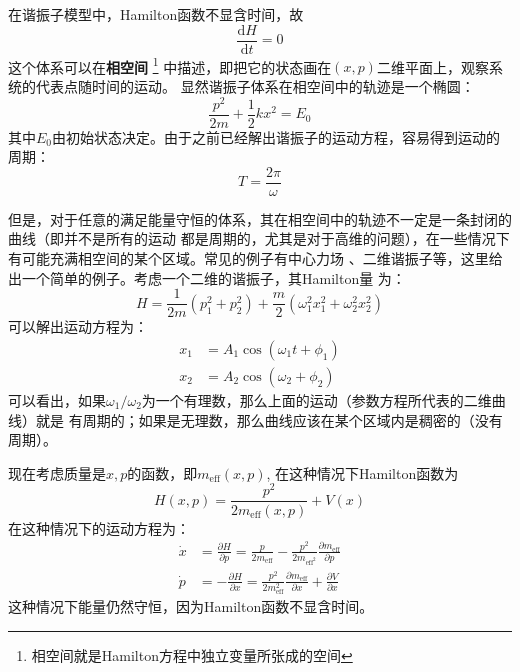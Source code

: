    \par 
    在谐振子模型中，Hamilton函数不显含时间，故
    \begin{equation}
        \frac {\mathrm{d}H}{\mathrm{d}t} = 0
    \end{equation}
    这个体系可以在\textbf{相空间}
    \footnote{相空间就是Hamilton方程中独立变量所张成的空间}
    中描述，即把它的状态画在$(x,p)$二维平面上，观察系统的代表点随时间的运动。
    显然谐振子体系在相空间中的轨迹是一个椭圆：
    \begin{equation}
        \frac{p^2}{2m} + \frac 12 kx^2 = E_0
    \end{equation}
    其中$E_0$由初始状态决定。由于之前已经解出谐振子的运动方程，容易得到运动的周期：
    \begin{equation}
        T = \frac{2\pi}{\omega}
    \end{equation}
    \par 
    但是，对于任意的满足能量守恒的体系，其在相空间中的轨迹不一定是一条封闭的曲线（即并不是所有的运动
    都是周期的，尤其是对于高维的问题），在一些情况下有可能充满相空间的某个区域。常见的例子有中心力场
    \cite{Landau2007mechanics}、二维谐振子等\cite{B2006经典力学的数学方法}，这里给出一个简单的例子。考虑一个二维的谐振子，其Hamilton量
    为：
    \begin{equation}
        H = \frac{1}{2m}(p_1^2 + p_2^2) + \frac{m}{2}(\omega_1^2x_1^2 + \omega_2^2x_2^2)
    \end{equation}
    可以解出运动方程为：
    \begin{equation}
        \begin{split}
            x_1 &= A_1\cos(\omega_1 t + \phi_1)\\
            x_2 &= A_2\cos(\omega_2 + \phi_2)
        \end{split}
    \end{equation}
    可以看出，如果$\omega_1 / \omega_2$为一个有理数，那么上面的运动（参数方程所代表的二维曲线）就是
    有周期的；如果是无理数，那么曲线应该在某个区域内是稠密的（没有周期）。
    \par
    现在考虑质量是$x,p$的函数，即$m_\mathrm{eff}(x,p)$, 在这种情况下Hamilton函数为
    \begin{equation}
        H(x,p) = \frac {p^2}{2m_\mathrm{eff}(x,p)} + V(x)
    \end{equation}
    在这种情况下的运动方程为：
    \begin{equation}
        \begin{split}
            \dot{x} &= \frac {\partial H}{\partial p} = \frac {p}{2m_{\mathrm{eff}}} - \frac {p^2}{2m_{\mathrm{eff}^2}} \frac {\partial m_\mathrm{eff}}{\partial p} \\
            \dot{p} &= -\frac {\partial H}{\partial x} = \frac {p^2}{2m_\mathrm{eff}^2} \frac {\partial m_\mathrm{eff}}{\partial x} + \frac {\partial V}{\partial x}
        \end{split}
    \end{equation}
    这种情况下能量仍然守恒，因为Hamilton函数不显含时间。
